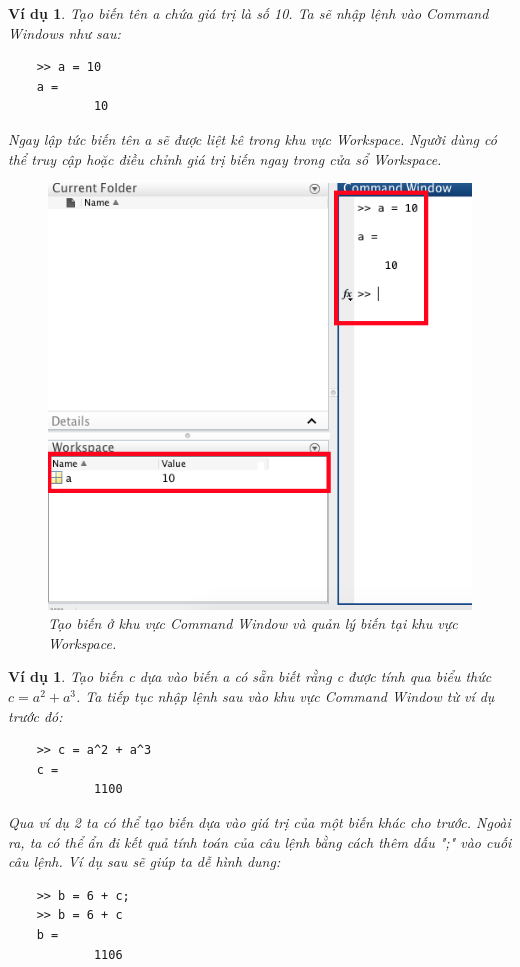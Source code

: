 \documentclass[12pt,a4paper]{article}
\newtheorem{vd}[thm]{Ví dụ}
\begin{document}
\begin{vd}
\normalfont
Tạo biến tên a chứa giá trị là số 10. Ta sẽ nhập lệnh vào Command Windows như sau:
\begin{lstlisting}
	>> a = 10
	a =
    		10
\end{lstlisting}
Ngay lập tức biến tên a sẽ được liệt kê trong khu vực Workspace. Người dùng có thể truy cập hoặc điều chỉnh giá trị biến ngay trong cửa sổ Workspace.\\
\begin{center}
	\begin{figure}[htp]
		\begin{center}
		\includegraphics[scale=.5]{hinhtieuluan/pic4}
		\end{center}
		\caption{Tạo biến ở khu vực Command Window và quản lý biến tại khu vực Workspace.}
		\label{refhinh4}
	\end{figure}
\end{center}
\end{vd}
\begin{vd}
\normalfont Tạo biến c dựa vào biến a có sẵn biết rằng c được tính qua biểu thức $c=a^2+a^3$. Ta tiếp tục nhập lệnh sau vào khu vực Command Window từ ví dụ trước đó:
\begin{lstlisting}
	>> c = a^2 + a^3
	c =
        	1100
\end{lstlisting}
Qua ví dụ 2 ta có thể tạo biến dựa vào giá trị của một biến khác cho trước. Ngoài ra, ta có thể ẩn đi kết quả tính toán của câu lệnh bằng cách thêm dấu ";" vào cuối câu lệnh. Ví dụ sau sẽ giúp ta dễ hình dung:
\begin{lstlisting}
	>> b = 6 + c;
	>> b = 6 + c
	b =
        	1106
\end{lstlisting}
\end{vd}
\end{document}
